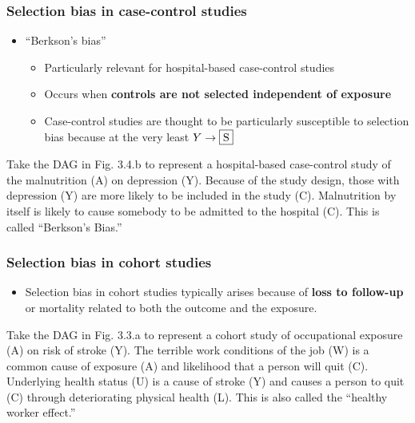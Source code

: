 \documentclass[
]{book}
\providecommand{\tightlist}{%
  \setlength{\itemsep}{0pt}\setlength{\parskip}{0pt}}
\begin{document}
\hypertarget{selection-bias-in-case-control-studies}{%
\subsubsection{Selection bias in case-control studies}\label{selection-bias-in-case-control-studies}}

\begin{itemize}
\tightlist
\item
  ``Berkson's bias''

  \begin{itemize}
  \tightlist
  \item
    Particularly relevant for hospital-based case-control studies
  \item
    Occurs when \textbf{controls are not selected independent of exposure}
  \item
    Case-control studies are thought to be particularly susceptible to selection bias because at the very least \(Y \rightarrow \fbox{S}\)
  \end{itemize}
\end{itemize}

Take the DAG in Fig. 3.4.b to represent a hospital-based case-control study of the malnutrition (A) on depression (Y). Because of the study design, those with depression (Y) are more likely to be included in the study (C). Malnutrition by itself is likely to cause somebody to be admitted to the hospital (C). This is called ``Berkson's Bias.''

\hypertarget{selection-bias-in-cohort-studies}{%
\subsubsection{Selection bias in cohort studies}\label{selection-bias-in-cohort-studies}}

\begin{itemize}
\tightlist
\item
  Selection bias in cohort studies typically arises because of \textbf{loss to follow-up} or mortality related to both the outcome and the exposure.
\end{itemize}

Take the DAG in Fig. 3.3.a to represent a cohort study of occupational exposure (A) on risk of stroke (Y). The terrible work conditions of the job (W) is a common cause of exposure (A) and likelihood that a person will quit (C). Underlying health status (U) is a cause of stroke (Y) and causes a person to quit (C) through deteriorating physical health (L). This is also called the ``healthy worker effect.''
\end{document}
